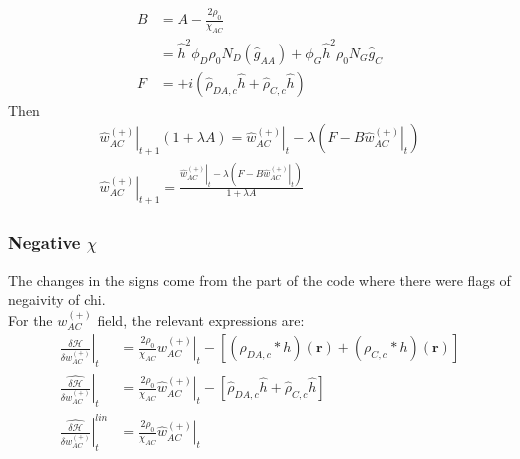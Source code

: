 \documentclass{article}
\begin{document}
  \begin{align*}
    B &= A - \frac{2\rho_0}{\chi_{AC}} \\
      &= \hat{h}^2 \phi_D \rho_0 N_D
          (\hat{g}_{AA} ) 
          + \phi_G   \hat{h}^2  \rho_0 N_G 
          \hat{g}_{C}\\
    F &= + i ( \hat{\rho}_{DA,c} \hat{h}
              + \hat{\rho}_{C,c} \hat{h} )
  \end{align*}
  Then
  \begin{align*}
    \left. \hat{w}_{AC}^{(+)} \right|_{t+1} ( 1 + \lambda A ) =
      \left. \hat{w}_{AC}^{(+)} \right|_t
      - \lambda \left( F - B \left. \hat{w}_{AC}^{(+)} \right|_t \right) \\
    \left. \hat{w}_{AC}^{(+)} \right|_{t+1} =
    \frac{\left. \hat{w}_{AC}^{(+)} \right|_t - \lambda
            \left( F - B \left. \hat{w}_{AC}^{(+)} \right|_t \right)}
         {1 + \lambda A}
  \end{align*}
  
    \subsubsection{Negative $\chi$}
    The changes in the signs come from the part of the code where there were flags of negaivity of chi. \\
    For the $w_{AC}^{(+)}$ field, the relevant expressions are:
  \begin{align*}
    \left. \frac{\delta \mathcal{H}}{\delta  w_{AC}^{(+)} } \right|_t &=
      \frac{2\rho_0}{\chi_{AC}} \left. w_{AC}^{(+)} \right|_t
      -   [ (\rho_{DA,c} \ast h)(\mathbf{r})
            + (\rho_{C,c} \ast h)(\mathbf{r}) ] \\
      \left. \hat{\frac{\delta \mathcal{H}}{\delta w_{AC}^{(+)}}} \right|_t &=
      \frac{2\rho_0}{\chi_{AC}} \left. \hat{w}_{AC}^{(+)} \right|_t
      -   [ \hat{\rho}_{DA,c} \hat{h}
            + \hat{\rho}_{C,c} \hat{h} ] 
            \\
            \left.
            \hat{\frac{\delta \mathcal{H}}{\delta w_{AC}^{(+)}}}
            \right| ^{lin}_t &=
            \frac{2\rho_0}{\chi_{AC}} \left. \hat{w}_{AC}^{(+)} \right|_t
  \end{align*}
  
\end{document}

